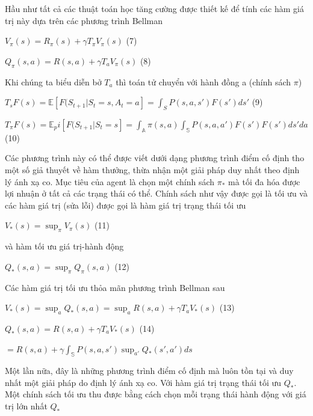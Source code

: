 \documentclass[14pt]{extreport}
\begin{document}
 Hầu như tất cả các thuật toán học tăng cường được thiết kế để tính các hàm giá trị này dựa trên các phương trình Bellman
 
 \begin{center}
 $V_ {\pi} (s)=R_{\pi} (s)+ \gamma T_{\pi}V_{\pi}(s)    $     (7)
 
 $Q_{\pi}(s,a) = R(s,a)+ \gamma T_a V_ {\pi}(s) $        (8)
 \end{center}
 
 Khi chúng ta biểu diễn bở $T_a$ thì toán tử chuyển với hành đồng a (chính sách $\pi$)
 
 \begin{center}
 $T_s F(s)=\mathbb{E}[F(S_{t+1} |S_t = s,A_t =a]= \int _{S} P(s,a,s') F(s') ds'$  (9)
 
 $T_ \pi F(s)= \mathbb{E}_ pi [F(S_{t+1} |S_t = s]= \int _{\mathbb{A} } \pi (s,a) \int _{\mathbb{S}} P(s,a,a') F(s') F(s') ds' da$  (10)
 \end{center}
 
 Các phương trình này có thể được viết dưới dạng phương trình điểm cố định tho một số giả thuyết về hàm thưởng, thừa nhận một giải pháp duy nhất theo định lý ánh xạ co. Mục tiêu của agent là chọn một chính sách $\pi_{*}$ mà tối đa hóa được lợi nhuận ở tất cả các trạng thái có thể. Chính sách như vậy được gọi là tối ưu và các hàm giá trị (sửa lỗi) được gọi là hàm giá trị trạng thái tối ưu
 
 \begin{center}
 $V_{*} (s)= \sup_{\pi} V_\pi (s)$  (11)
 \end{center}
 
 và hàm tối ưu giá trị-hành động
 
 \begin{center}
 $Q_{*}(s,a)= \sup _\pi Q_\pi (s,a)$ (12)
 \end{center}
 
 Các hàm giá trị tối ưu thỏa mãn phương trình Bellman sau
 
 \begin{center}
 $V_* (s)= \sup _a Q_* (s,a)=\sup _a {R(s,a)+\gamma T_a V_* (s)}$ (13)
 
 $Q_*(s,a)=R(s,a)+\gamma T_a V_* (s)$ (14)
 
 $=R(s,a)+\gamma \int _{\mathbb{S}}P(s,a,s') \sup _{a'} Q_*(s',a')ds$
\end{center}

Một lần nữa, đây là những phương trình điểm cố định mà luôn tồn tại và duy nhất một giải pháp do định lý ánh xạ co. Với hàm giá trị trạng thái tối ưu $Q_*$. Một chính sách tối ưu thu được bằng cách chọn mỗi trạng thái hành động với giá trị lớn nhất $Q_*$
\end{document}
